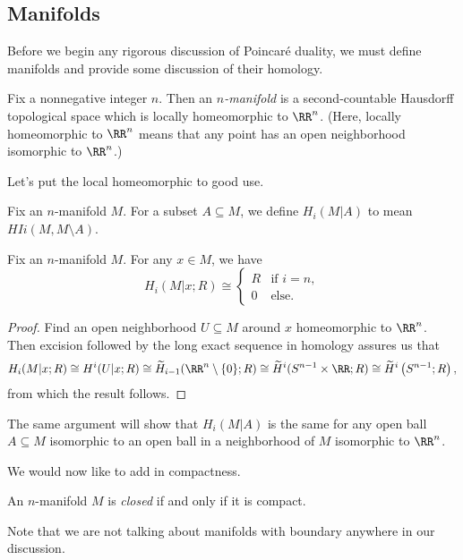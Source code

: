 \documentclass[../notes.tex]{subfiles}
\begin{document}
\subsection{Manifolds}
Before we begin any rigorous discussion of Poincar\'e duality, we must define manifolds and provide some discussion of their homology.
\begin{definition}[manifold]
	Fix a nonnegative integer $n$. Then an \textit{$n$-manifold} is a second-countable Hausdorff topological space which is locally homeomorphic to $\RR^n$. (Here, locally homeomorphic to $\RR^n$ means that any point has an open neighborhood isomorphic to $\RR^n$.)
\end{definition}
Let's put the local homeomorphic to good use.
\begin{notation}
	Fix an $n$-manifold $M$. For a subset $A\subseteq M$, we define $H_i(M|A)$ to mean $HIi(M,M\setminus A)$.
\end{notation}
\begin{lemma} \label{lem:local-homo-manifold}
	Fix an $n$-manifold $M$. For any $x\in M$, we have
	\[H_i(M|x;R)\cong\begin{cases}
		R & \text{if }i=n, \\
		0 & \text{else}.
	\end{cases}\]
\end{lemma}
\begin{proof}
	Find an open neighborhood $U\subseteq M$ around $x$ homeomorphic to $\RR^n$. Then excision followed by the long exact sequence in homology assures us that
	\[H_i(M|x;R)\cong H^i(U|x;R)\cong\widetilde H_{i-1}(\RR^n\setminus\{0\};R)\cong\widetilde H^i(S^{n-1}\times\RR;R)\cong\widetilde H^i\left(S^{n-1};R\right),\]
	from which the result follows.
\end{proof}
\begin{remark}
	The same argument will show that $H_i(M|A)$ is the same for any open ball $A\subseteq M$ isomorphic to an open ball in a neighborhood of $M$ isomorphic to $\RR^n$.
\end{remark}
We would now like to add in compactness.
\begin{definition}[closed]
	An $n$-manifold $M$ is \textit{closed} if and only if it is compact.
\end{definition}
Note that we are not talking about manifolds with boundary anywhere in our discussion.
\end{document}
